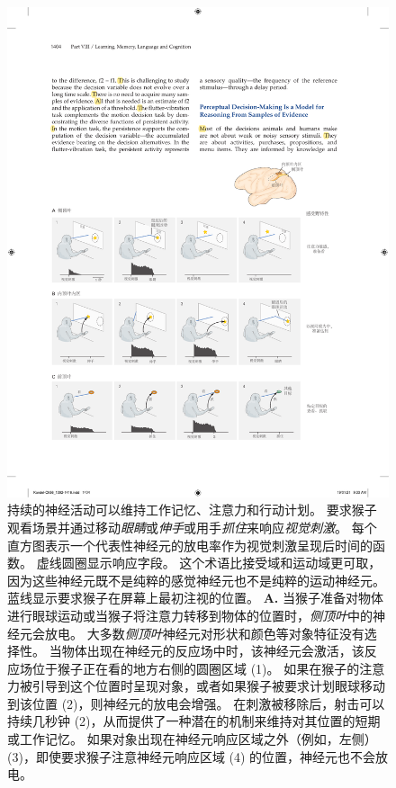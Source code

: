 \begin{figure}[htbp]
	\centering
	\includegraphics[width=1.0\linewidth]{chap56/fig_56_7}
	\caption{持续的神经活动可以维持工作记忆、注意力和行动计划。
		要求猴子观看场景并通过移动\textit{眼睛}或\textit{伸手}或用手\textit{抓住}来响应\textit{视觉刺激}。
		每个直方图表示一个代表性神经元的放电率作为视觉刺激呈现后时间的函数。
		虚线圆圈显示响应字段。
		这个术语比接受域和运动域更可取，因为这些神经元既不是纯粹的感觉神经元也不是纯粹的运动神经元。
		蓝线显示要求猴子在屏幕上最初注视的位置。
		\textbf{A.} 当猴子准备对物体进行眼球运动或当猴子将注意力转移到物体的位置时，\textit{侧顶叶}中的神经元会放电。
		大多数\textit{侧顶叶}神经元对形状和颜色等对象特征没有选择性。
		当物体出现在神经元的反应场中时，该神经元会激活，该反应场位于猴子正在看的地方右侧的圆圈区域 (1)。
		如果在猴子的注意力被引导到这个位置时呈现对象，或者如果猴子被要求计划眼球移动到该位置 (2)，则神经元的放电会增强。
		在刺激被移除后，射击可以持续几秒钟 (2)，从而提供了一种潜在的机制来维持对其位置的短期或工作记忆。
		如果对象出现在神经元响应区域之外（例如，左侧）(3)，即使要求猴子注意神经元响应区域 (4) 的位置，神经元也不会放电。
}
\end{figure}
